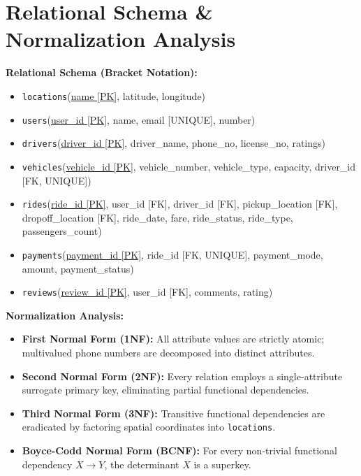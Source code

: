 \section{Relational Schema \& Normalization Analysis}
\textbf{Relational Schema (Bracket Notation):}
\begin{itemize}[itemsep=1pt, topsep=1.5pt, parsep=0pt]
    \item \texttt{locations}(\underline{name [PK]}, latitude, longitude)
    \item \texttt{users}(\underline{user\_id [PK]}, name, email [UNIQUE], number)
    \item \texttt{drivers}(\underline{driver\_id [PK]}, driver\_name, phone\_no, license\_no, ratings)
    \item \texttt{vehicles}(\underline{vehicle\_id [PK]}, vehicle\_number, vehicle\_type, capacity, driver\_id [FK, UNIQUE])
    \item \texttt{rides}(\underline{ride\_id [PK]}, user\_id [FK], driver\_id [FK], pickup\_location [FK], dropoff\_location [FK], ride\_date, fare, ride\_status, ride\_type, passengers\_count)
    \item \texttt{payments}(\underline{payment\_id [PK]}, ride\_id [FK, UNIQUE], payment\_mode, amount, payment\_status)
    \item \texttt{reviews}(\underline{review\_id [PK]}, user\_id [FK], comments, rating)
\end{itemize}

\textbf{Normalization Analysis:}
\begin{itemize}[itemsep=1pt, topsep=1.5pt, parsep=0pt]
    \item \textbf{First Normal Form (1NF):} All attribute values are strictly atomic; multivalued phone numbers are decomposed into distinct attributes.
    \item \textbf{Second Normal Form (2NF):} Every relation employs a single-attribute surrogate primary key, eliminating partial functional dependencies.
    \item \textbf{Third Normal Form (3NF):} Transitive functional dependencies are eradicated by factoring spatial coordinates into \texttt{locations}.
    \item \textbf{Boyce-Codd Normal Form (BCNF):} For every non-trivial functional dependency $X \rightarrow Y$, the determinant $X$ is a superkey.
\end{itemize}
